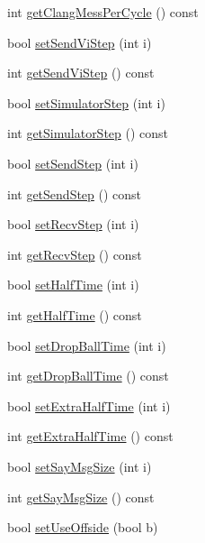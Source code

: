 \begin{DoxyCompactItemize}
int \hyperlink{classServerSettings_a27380257213628762091c93d58390948}{get\+Clang\+Mess\+Per\+Cycle} () const 
\item 
bool \hyperlink{classServerSettings_a088043491ed1bc03040dd887ad5f47e1}{set\+Send\+Vi\+Step} (int i)
\item 
int \hyperlink{classServerSettings_aaa32ec6cb242077d05df626c84781445}{get\+Send\+Vi\+Step} () const 
\item 
bool \hyperlink{classServerSettings_a2869c05d50f4ef6d6204c0ec8ca3b59e}{set\+Simulator\+Step} (int i)
\item 
int \hyperlink{classServerSettings_a9500227b5ccc6d94fd6b3d7e6b36695e}{get\+Simulator\+Step} () const 
\item 
bool \hyperlink{classServerSettings_ac602b593363e8541929e4f7918b90588}{set\+Send\+Step} (int i)
\item 
int \hyperlink{classServerSettings_a0320ba9547d7a54d48d22eb74b993f21}{get\+Send\+Step} () const 
\item 
bool \hyperlink{classServerSettings_a1a9f458b7f01ee56d0f80226d9dc3f39}{set\+Recv\+Step} (int i)
\item 
int \hyperlink{classServerSettings_a4ef829c05858d96172f7553e877954e7}{get\+Recv\+Step} () const 
\item 
bool \hyperlink{classServerSettings_a3ed08dbc57467699cca28e5df55c87c1}{set\+Half\+Time} (int i)
\item 
int \hyperlink{classServerSettings_a36e248356e280136039977eb04e7ca96}{get\+Half\+Time} () const 
\item 
bool \hyperlink{classServerSettings_a62e5564cbcb446a58f7f308f765c0c16}{set\+Drop\+Ball\+Time} (int i)
\item 
int \hyperlink{classServerSettings_a8c79e76c186c51c64e856ebfa1d5af32}{get\+Drop\+Ball\+Time} () const 
\item 
bool \hyperlink{classServerSettings_ae1f80bf2138edc9caa65f6adb3c0bc49}{set\+Extra\+Half\+Time} (int i)
\item 
int \hyperlink{classServerSettings_a1ec8e7e51fbbdc6f81a7fd9d142998ea}{get\+Extra\+Half\+Time} () const 
\item 
bool \hyperlink{classServerSettings_a3f05df809345b0b22aef3268effa213c}{set\+Say\+Msg\+Size} (int i)
\item 
int \hyperlink{classServerSettings_a84d032cebb7961efe59ad79365ff5731}{get\+Say\+Msg\+Size} () const 
\item 
bool \hyperlink{classServerSettings_a37fc1b150b744608c9263112f7fcaecb}{set\+Use\+Offside} (bool b)

\end{DoxyCompactItemize}
